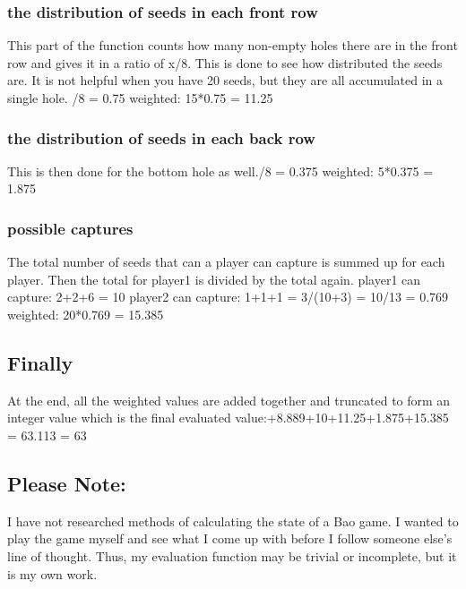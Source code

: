 \documentclass[a4paper]{article}
\begin{document}
	\subsubsection{the distribution of seeds in each front row}
	This part of the function counts how many non-empty holes there are in the front row and gives it in a ratio of x/8. This
	is done to see how distributed the seeds are. It is not helpful when you have 20 seeds, but they are all accumulated in
	a single hole. /8 = 0.75 \newline
	weighted: 15*0.75 = 11.25
	\subsubsection{the distribution of seeds in each back row}
	This is then done for the bottom hole as well./8 = 0.375\newline
	weighted: 5*0.375 = 1.875
	\subsubsection{possible captures}
	The total number of seeds that can a player can capture is summed up for each player. Then the total for player1 is divided 		by the total again.  \newline
	player1 can capture: 2+2+6 = 10\newline
	player2 can capture: 1+1+1 = 3/(10+3) = 10/13 = 0.769\newline
	weighted: 20*0.769 = 15.385
	\subsection{Finally}
	At the end, all the weighted values are added together and truncated to form an integer value which is the final evaluated 			value:+8.889+10+11.25+1.875+15.385 = 63.113 = 63
	\subsection{Please Note:}
	I have not researched methods of calculating the state of a Bao game. I wanted to play the game myself and see what I come 			up with before I follow someone else's line of thought. Thus, my evaluation function may be trivial or incomplete, but it is	 	my own work.
	
\end{document}
